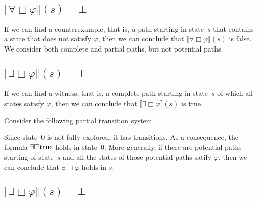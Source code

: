 \documentclass[12pt]{article}
\newcommand{\always}{\Box}
\newcommand{\TRUE}{\mbox{\lstinline{true}}}
\theoremstyle{definition}
\newcommand{\satisfaction}[1]{\llbracket #1 \rrbracket}
\newcommand{\bottom}{\mathord{\perp}}
\begin{document}
\subsection*{$\satisfaction{\forall \always \varphi}(s) = \bottom$}

If we can find a counterexample, that is, a path starting in state~$s$ that contains a state that does not satisfy $\varphi$, then we can conclude that $\satisfaction{\forall \always \varphi}(s)$ is false.  We consider both complete and partial paths, but not potential paths.


\subsection*{$\satisfaction{\exists \always \varphi}(s) = \top$}

If we can find a witness, that is, a complete path starting in state~$s$ of which all states satisfy $\varphi$, then we can conclude that $\satisfaction{\exists \always \varphi}(s)$ is true.

Consider the following partial transition system.
\begin{center}
\end{center}
Since state~0 is not fully explored, it has transitions.  As a consequence, the formula $\exists \always \TRUE$ holds in state~0.  More generally, if there are potential paths starting of state~$s$ and all the states of those potential paths satify $\varphi$, then we can conclude that $\exists \always \varphi$ holds in $s$.

\subsection*{$\satisfaction{\exists \always \varphi}(s) = \bottom$}
\end{document}
